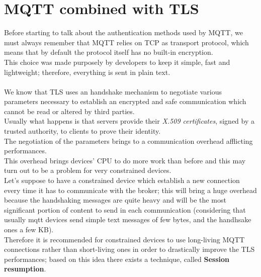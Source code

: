 \documentclass[12pt]{report}
\begin{document}
{\clearpage

\section{MQTT combined with TLS}
\bigskip
Before starting to talk about the authentication methods used by MQTT, we must always remember that MQTT relies on TCP as transport protocol, which means that by default the protocol itself has no built-in encryption.\\
This choice was made purposely by developers to keep it simple, fast and lightweight; therefore, everything is sent in plain text.\\\\
We know that TLS uses an handshake mechanism to negotiate various parameters necessary to establish an encrypted and safe communication which cannot be read or altered by third parties.\\
Usually what happens is that servers provide their \textit{X.509 certificates}, signed by a trusted authority, to clients to prove their identity.\\
The negotiation of the parameters brings to a communication overhead afflicting performances.\\
This overhead brings devices' CPU to do more work than before and this may turn out to be a problem for very constrained devices.\\
Let's suppose to have a constrained device which establish a new connection every time it has to communicate with the broker; this will bring a huge overhead because the handshaking messages are quite heavy and will be the most significant portion of content to send in each communication (considering that usually mqtt devices send simple text messages of few bytes, and the handhsake ones a few KB).\\
Therefore it is recommended for constrained devices to use long-living MQTT connections rather than short-living ones in order to drastically improve the TLS performances; based on this idea there exists a technique, called \textbf{Session resumption}.

}
\end{document}
